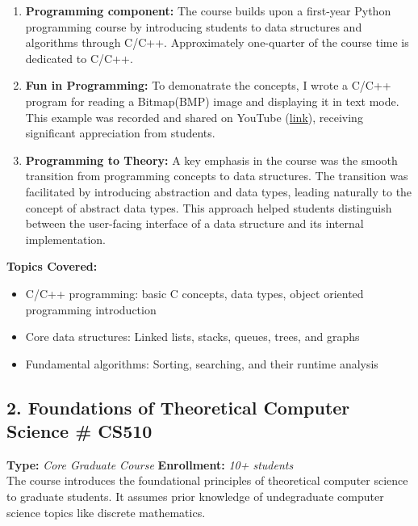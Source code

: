 \documentclass[11pt,a4paper,sans]{moderncv} %
\begin{document}
\begin{enumerate}
 \item \textbf{Programming component:} The course builds upon a first-year Python programming course by introducing students to data structures and algorithms through C/C++. Approximately one-quarter of the course time is dedicated to C/C++.
 \item \textbf{Fun in Programming:} To demonatrate the concepts, I wrote a C/C++ program for reading a Bitmap(BMP) image and displaying it in text mode. This example was recorded and shared on YouTube (\href{https://youtu.be/xB0ifokXdWs}{link}), receiving significant appreciation from students.
\item \textbf{Programming to Theory:} A key emphasis in the course was the smooth transition from programming concepts to data structures. The transition was facilitated by introducing abstraction and data types, leading naturally to the concept of abstract data types. This approach helped students distinguish between the user-facing interface of a data structure and its internal implementation.
\end{enumerate}


\textbf{Topics Covered:}
\begin{itemize}
    \item C/C++ programming: basic C concepts, data types, object oriented programming introduction
    \item Core data structures: Linked lists, stacks, queues, trees, and graphs
    \item Fundamental algorithms: Sorting, searching, and their runtime analysis
\end{itemize}

\subsection*{2. Foundations of Theoretical Computer Science \null\hfill \# CS510}
\textbf{Type:} \emph{Core Graduate Course} \null\hfill \textbf{Enrollment:} \emph{10+ students} \\
The course introduces the foundational principles of theoretical computer science to graduate students. It assumes prior knowledge of undegraduate computer science topics like discrete mathematics.
\end{document}
